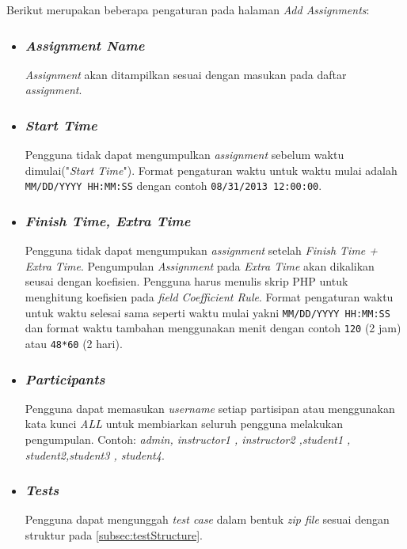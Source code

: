 Berikut merupakan beberapa pengaturan pada halaman \textit{Add Assignments}:
\begin{itemize}
\item \subsubsection{\textit{Assignment Name}}
\textit{Assignment} akan ditampilkan sesuai dengan masukan pada daftar \textit{assignment}.

\item \subsubsection{\textit{Start Time}}
Pengguna tidak dapat mengumpulkan \textit{assignment} sebelum waktu dimulai("\textit{Start Time}"). Format pengaturan waktu untuk waktu mulai adalah \verb|MM/DD/YYYY HH:MM:SS| dengan contoh \verb|08/31/2013 12:00:00|. 

\item \subsubsection{\textit{Finish Time, Extra Time}}
Pengguna tidak dapat mengumpukan \textit{assignment} setelah \textit{Finish Time + Extra Time}. Pengumpulan \textit{Assignment} pada \textit{Extra Time} akan dikalikan seusai dengan koefisien. Pengguna harus menulis skrip PHP untuk menghitung koefisien pada \textit{field Coefficient Rule}. Format pengaturan waktu untuk waktu selesai sama seperti waktu mulai yakni \verb|MM/DD/YYYY HH:MM:SS| dan format waktu tambahan menggunakan menit dengan contoh \verb|120| (2 jam) atau \verb|48*60| (2 hari).  

\item \subsubsection{\textit{Participants}}
Pengguna dapat memasukan \textit{username} setiap partisipan atau menggunakan kata kunci \textit{ALL} untuk membiarkan seluruh pengguna melakukan pengumpulan. Contoh: \textit{admin, instructor1 , instructor2 ,student1  ,   student2,student3 , student4}.

\item \subsubsection{\textit{Tests}}
Pengguna dapat mengunggah \textit{test case} dalam bentuk \textit{zip file} sesuai dengan struktur pada \ref{subsec:testStructure}.


\end{itemize}

